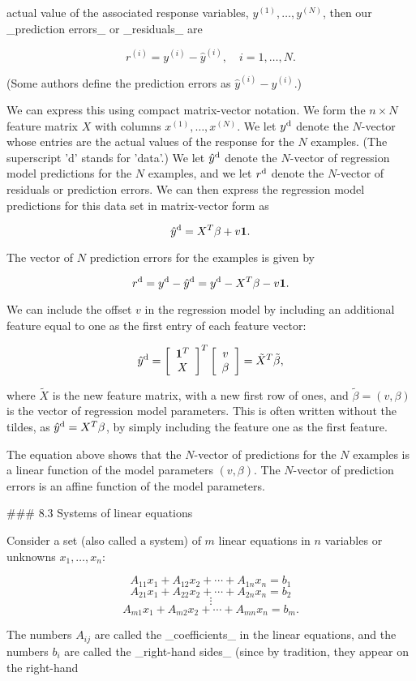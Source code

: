 actual value of the associated response variables, \(y^{(1)},\ldots,y^{(N)}\), then our _prediction errors_ or _residuals_ are

\[r^{(i)}=y^{(i)}-\hat{y}^{(i)},\quad i=1,\ldots,N.\]

(Some authors define the prediction errors as \(\hat{y}^{(i)}-y^{(i)}\).)

We can express this using compact matrix-vector notation. We form the \(n\times N\) feature matrix \(X\) with columns \(x^{(1)},\ldots,x^{(N)}\). We let \(y^{\rm d}\) denote the \(N\)-vector whose entries are the actual values of the response for the \(N\) examples. (The superscript 'd' stands for 'data'.) We let \(\hat{y}^{\rm d}\) denote the \(N\)-vector of regression model predictions for the \(N\) examples, and we let \(r^{\rm d}\) denote the \(N\)-vector of residuals or prediction errors. We can then express the regression model predictions for this data set in matrix-vector form as

\[\hat{y}^{\rm d}=X^{T}\beta+v{\bf 1}.\]

The vector of \(N\) prediction errors for the examples is given by

\[r^{\rm d}=y^{\rm d}-\hat{y}^{\rm d}=y^{\rm d}-X^{T}\beta-v{\bf 1}.\]

We can include the offset \(v\) in the regression model by including an additional feature equal to one as the first entry of each feature vector:

\[\hat{y}^{\rm d}=\left[\begin{array}{c}{\bf 1}^{T}\\ X\end{array}\right]^{T}\left[\begin{array}{c}v\\ \beta\end{array}\right]=\tilde{X}^{T}\tilde{\beta},\]

where \(\tilde{X}\) is the new feature matrix, with a new first row of ones, and \(\tilde{\beta}=(v,\beta)\) is the vector of regression model parameters. This is often written without the tildes, as \(\hat{y}^{\rm d}=X^{T}\beta\), by simply including the feature one as the first feature.

The equation above shows that the \(N\)-vector of predictions for the \(N\) examples is a linear function of the model parameters \((v,\beta)\). The \(N\)-vector of prediction errors is an affine function of the model parameters.

### 8.3 Systems of linear equations

Consider a set (also called a system) of \(m\) linear equations in \(n\) variables or unknowns \(x_{1},\ldots,x_{n}\):

\[A_{11}x_{1}+A_{12}x_{2}+\cdots+A_{1n}x_{n} = b_{1}\] \[A_{21}x_{1}+A_{22}x_{2}+\cdots+A_{2n}x_{n} = b_{2}\] \[\vdots\] \[A_{m1}x_{1}+A_{m2}x_{2}+\cdots+A_{mn}x_{n} = b_{m}.\]

The numbers \(A_{ij}\) are called the _coefficients_ in the linear equations, and the numbers \(b_{i}\) are called the _right-hand sides_ (since by tradition, they appear on the right-hand 